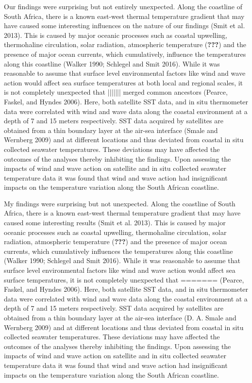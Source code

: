 \documentclass[12pt,A4paper,]{article}
\begin{document}
Our findings were surprising but not entirely unexpected. Along the
coastline of South Africa, there is a known east-west thermal
temperature gradient that may have caused some interesting influences on
the nature of our findings (Smit et al. 2013). This is caused by major
oceanic processes such as coastal upwelling, thermohaline circulation,
solar radiation, atmospheric temperature ({\textbf{???}}) and the
presence of major ocean currents, which cumulatively, influence the
temperatures along this coastline (Walker 1990; Schlegel and Smit 2016).
While it was reasonable to assume that surface level environmental
factors like wind and wave action would affect sea surface temperatures
at both local and regional scales, it is not completely unexpected that
||||||| merged common ancestors
(Pearce, Faskel, and Hyndes 2006). Here, both satellite SST data, and in
situ thermometer data were correlated with wind and wave data along the
coastal environment at a depth of 7 and 15 meters respectively. SST data
acquired by satellites are obtained from a thin boundary layer at the
air-sea interface (Smale and Wernberg 2009) and at different locations
and thus deviated from coastal in situ collected seawater temperatures.
These deviations may have affected the outcomes of the analyses thereby
inhibiting the findings. Upon assessing the impacts of wind and wave
action on satellite and in situ collected seawater temperature data it
was found that wind and wave action had insignificant impacts on the
temperature variation along the South African coastline.

My findings were surprising but not unexpected. Along the coastline of
South Africa, there is a known east-west thermal temperature gradient
that may have caused some interesting results (Smit et al. 2013). This
is caused by major oceanic processes such as coastal upwelling,
thermohaline circulation, solar radiation, atmospheric temperature
({\textbf{???}}) and the presence of major ocean currents, which
cumulatively influences the temperatures along this coastline (Walker
1990; Schlegel and Smit 2016). While it was reasonable to assume that
surface level environmental factors like wind and wave action would
affect sea surface temperatures, it is not completely unexpected that
=======
(Pearce, Faskel, and Hyndes 2006). Here, both satellite SST data, and in
situ thermometer data were correlated with wind and wave data along the
coastal environment at a depth of 7 and 15 meters respectively. SST data
acquired by satellites are obtained from a thin boundary layer at the
air-sea interface (D. A. Smale and Wernberg 2009) and at different
locations and thus deviated from coastal in situ collected seawater
temperatures. These deviations may have affected the outcomes of the
analyses thereby inhibiting the findings. Upon assessing the impacts of
wind and wave action on satellite and in situ collected seawater
temperature data it was found that wind and wave action had
insignificant impacts on the temperature variation along the South
African coastline.
\end{document}
